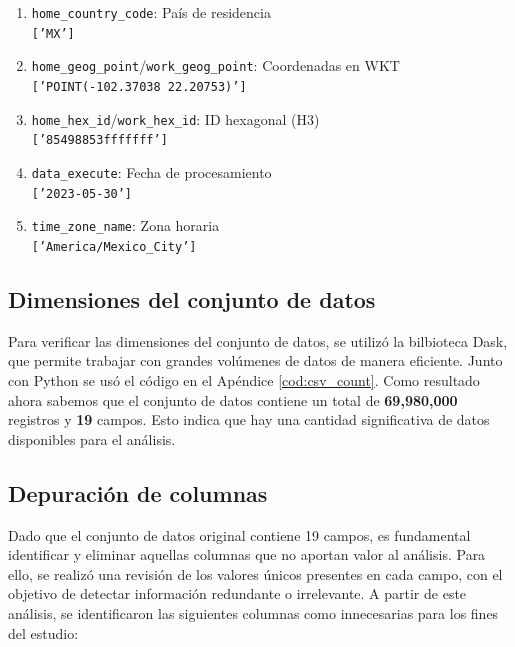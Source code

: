 \begin{enumerate}[leftmargin=*, align=left, noitemsep]
    \item \texttt{home\_country\_code}: País de residencia \\ 
    \footnotesize{\texttt{['MX']}}
    \normalsize

    \item \texttt{home\_geog\_point}/\texttt{work\_geog\_point}: Coordenadas en WKT \\ 
    \footnotesize{\texttt{['POINT(-102.37038 22.20753)']}}
    \normalsize

    \item \texttt{home\_hex\_id}/\texttt{work\_hex\_id}: ID hexagonal (H3) \\ 
    \footnotesize{\texttt{['85498853fffffff']}}
    \normalsize

    \item \texttt{data\_execute}: Fecha de procesamiento \\ 
    \footnotesize{\texttt{['2023-05-30']}}
    \normalsize

    \item \texttt{time\_zone\_name}: Zona horaria \\ 
    \footnotesize{\texttt{['America/Mexico\_City']}}
    \normalsize
\end{enumerate}
\vfill

\subsection{Dimensiones del conjunto de datos}
\label{subsec:dimensiones}
Para verificar las dimensiones del conjunto de datos, se utilizó la bilbioteca Dask, que permite trabajar con grandes volúmenes de datos de manera eficiente. Junto con Python se usó el código en el Apéndice \ref{cod:csv_count}. Como resultado ahora sabemos que el conjunto de datos contiene un total de \textbf{69,980,000} registros y \textbf{19} campos. Esto indica que hay una cantidad significativa de datos disponibles para el análisis.

\subsection{Depuración de columnas}
\label{subsec:depuracion_columnas}
Dado que el conjunto de datos original contiene 19 campos, es fundamental identificar y eliminar aquellas columnas que no aportan valor al análisis. Para ello, se realizó una revisión de los valores únicos presentes en cada campo, con el objetivo de detectar información redundante o irrelevante. A partir de este análisis, se identificaron las siguientes columnas como innecesarias para los fines del estudio:

